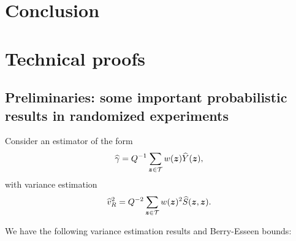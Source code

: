 \documentclass[12pt]{article}
\begin{document}
\section{Conclusion}




\appendix

\section{Technical proofs}
\subsection{Preliminaries: some important probabilistic results in randomized experiments}

Consider an estimator of the form
\begin{align*}
    {\widehat{\gamma}} = Q^{-1}\sum_{{\boldsymbol{z}}\in{\mathcal{T}}} w({\boldsymbol{z}})\widehat{Y}({\boldsymbol{z}}),
\end{align*}
with variance estimation
\begin{align*}
    \widehat{v}^2_R = Q^{-2}\sum_{{\boldsymbol{z}}\in{\mathcal{T}}} w({\boldsymbol{z}})^2 \widehat{S}({\boldsymbol{z}},{\boldsymbol{z}}).
\end{align*}

We have the following variance estimation results and Berry-Esseen bounds:
\end{document}
